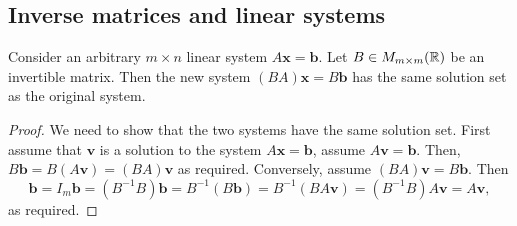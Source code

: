 \documentclass[10pt, a4paper]{article}
\newcommand{\mbf}[1]{\mathbf{#1}}
\begin{document}
\subsection{Inverse matrices and linear systems}
\begin{lemma}\label{pre_linalg_lem_solsetsam}
    Consider an arbitrary $m \times n$ linear system $A\mbf{x} = \mbf{b}$.
    Let $B \in M_{m \times m}(\mathbb{R})$ be an invertible matrix.
    Then the new system $(BA)\mbf{x} = B\mbf{b}$ has the same solution set as the original system.
    \begin{proof}
        We need to show that the two systems have the same solution set.
        First assume that $\mbf{v}$ is a solution to the system $A\mbf{x} = \mbf{b}$, assume $A\mbf{v} = \mbf{b}$.
        Then, $B\mbf{b} = B(A\mbf{v}) = (BA)\mbf{v}$ as required.
        Conversely, assume $(BA)\mbf{v} = B\mbf{b}$. Then
        \[
        \mbf{b} = I_m\mbf{b} = (B ^ {-1}B)\mbf{b} = B ^ {-1}(B\mbf{b}) = B ^ {-1}(BA\mbf{v}) = (B ^ {-1} B) A\mbf{v} = A\mbf{v},
        \]
        as required.
    \end{proof}
\end{lemma}
\end{document}
